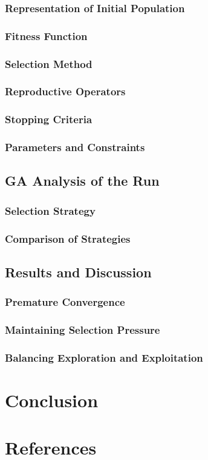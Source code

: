 \documentclass[conference]{inc/IEEEtran}
\begin{document}
\subsubsection{Representation of Initial Population}

\subsubsection{Fitness Function}

\subsubsection{Selection Method}

\subsubsection{Reproductive Operators}

\subsubsection{Stopping Criteria}

\subsubsection{Parameters and Constraints}
\subsection{GA Analysis of the Run}

\subsubsection{Selection Strategy}

\subsubsection{Comparison of Strategies}
\subsection{Results and Discussion}

\subsubsection{Premature Convergence}

\subsubsection{Maintaining Selection Pressure}

\subsubsection{Balancing Exploration and Exploitation}

\section{Conclusion}

\section*{References}




\end{document}

